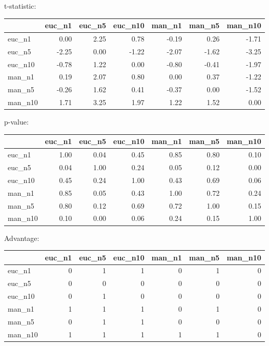t-statistic:
 \begin{tabular}{lrrrrrr}
\hline
         &   euc\_n1 &   euc\_n5 &   euc\_n10 &   man\_n1 &   man\_n5 &   man\_n10 \\
\hline
 euc\_n1  &     0.00 &     2.25 &      0.78 &    -0.19 &     0.26 &     -1.71 \\
 euc\_n5  &    -2.25 &     0.00 &     -1.22 &    -2.07 &    -1.62 &     -3.25 \\
 euc\_n10 &    -0.78 &     1.22 &      0.00 &    -0.80 &    -0.41 &     -1.97 \\
 man\_n1  &     0.19 &     2.07 &      0.80 &     0.00 &     0.37 &     -1.22 \\
 man\_n5  &    -0.26 &     1.62 &      0.41 &    -0.37 &     0.00 &     -1.52 \\
 man\_n10 &     1.71 &     3.25 &      1.97 &     1.22 &     1.52 &      0.00 \\
\hline
\end{tabular} 

p-value:
 \begin{tabular}{lrrrrrr}
\hline
         &   euc\_n1 &   euc\_n5 &   euc\_n10 &   man\_n1 &   man\_n5 &   man\_n10 \\
\hline
 euc\_n1  &     1.00 &     0.04 &      0.45 &     0.85 &     0.80 &      0.10 \\
 euc\_n5  &     0.04 &     1.00 &      0.24 &     0.05 &     0.12 &      0.00 \\
 euc\_n10 &     0.45 &     0.24 &      1.00 &     0.43 &     0.69 &      0.06 \\
 man\_n1  &     0.85 &     0.05 &      0.43 &     1.00 &     0.72 &      0.24 \\
 man\_n5  &     0.80 &     0.12 &      0.69 &     0.72 &     1.00 &      0.15 \\
 man\_n10 &     0.10 &     0.00 &      0.06 &     0.24 &     0.15 &      1.00 \\
\hline
\end{tabular} 

Advantage:
 \begin{tabular}{lrrrrrr}
\hline
         &   euc\_n1 &   euc\_n5 &   euc\_n10 &   man\_n1 &   man\_n5 &   man\_n10 \\
\hline
 euc\_n1  &        0 &        1 &         1 &        0 &        1 &         0 \\
 euc\_n5  &        0 &        0 &         0 &        0 &        0 &         0 \\
 euc\_n10 &        0 &        1 &         0 &        0 &        0 &         0 \\
 man\_n1  &        1 &        1 &         1 &        0 &        1 &         0 \\
 man\_n5  &        0 &        1 &         1 &        0 &        0 &         0 \\
 man\_n10 &        1 &        1 &         1 &        1 &        1 &         0 \\
\hline
\end{tabular} 

